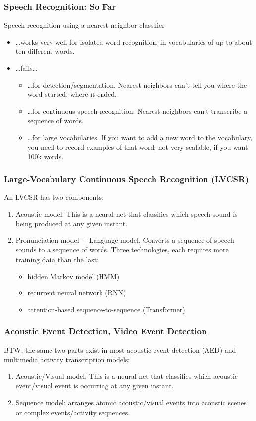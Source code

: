 \documentclass{beamer}
\begin{document}
\begin{frame}
  \frametitle{Speech Recognition: So Far}

  Speech recognition using a nearest-neighbor classifier
  \begin{itemize}
  \item \ldots works very well for isolated-word recognition, in vocabularies
    of up to about ten different words.
  \item \ldots fails\ldots
    \begin{itemize}
    \item \ldots for detection/segmentation.  Nearest-neighbors can't
      tell you where the word started, where it ended.
    \item \ldots for continuous speech recognition.  Nearest-neighbors
      can't transcribe a sequence of words.
    \item \ldots for large vocabularies.  If you want to add a new
      word to the vocabulary, you need to record examples of that
      word; not very scalable, if you want 100k words.
    \end{itemize}
  \end{itemize}
\end{frame}
  
\begin{frame}
  \frametitle{Large-Vocabulary Continuous Speech Recognition (LVCSR)}

  An LVCSR has two components:
  \begin{enumerate}
  \item Acoustic model.  This is a neural net that classifies which
    speech sound is being produced at any given instant.
  \item Pronunciation model + Language model. Converts a sequence of
    speech sounds to a sequence of words.  Three technologies, each requires
    more training data than the last:
    \begin{itemize}
    \item hidden Markov model (HMM)
    \item recurrent neural network (RNN)
    \item attention-based sequence-to-sequence (Transformer)
    \end{itemize}
  \end{enumerate}
\end{frame}

\begin{frame}
  \frametitle{Acoustic Event Detection, Video Event Detection}

  BTW, the same two parts exist in most acoustic event detection (AED) and
  multimedia activity transcription models:
  \begin{enumerate}
  \item Acoustic/Visual model.  This is a neural net that classifies which
    acoustic event/visual event is occurring at any given instant.
  \item Sequence model: arranges atomic acoustic/visual events into
    acoustic scenes or complex events/activity sequences.
  \end{enumerate}
\end{frame}
\end{document}
